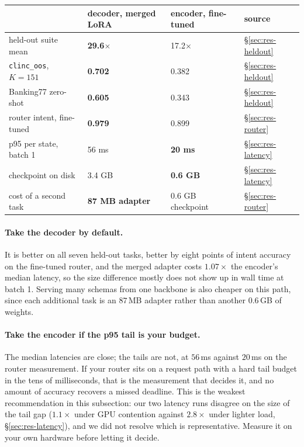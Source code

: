 \begin{center}
\begin{tabular}{llll}
\toprule
 & decoder, merged LoRA & encoder, fine-tuned & source \\
\midrule
held-out suite mean      & \textbf{29.6$\times$} & 17.2$\times$ & \S\ref{sec:res-heldout} \\
\texttt{clinc\_oos}, $K{=}151$ & \textbf{0.702} & 0.382 & \S\ref{sec:res-heldout} \\
Banking77 zero-shot      & \textbf{0.605} & 0.343 & \S\ref{sec:res-heldout} \\
router intent, fine-tuned & \textbf{0.979} & 0.899 & \S\ref{sec:res-router} \\
p95 per state, batch 1   & 56 ms & \textbf{20 ms} & \S\ref{sec:res-latency} \\
checkpoint on disk       & 3.4 GB & \textbf{0.6 GB} & \S\ref{sec:res-latency} \\
cost of a second task    & \textbf{87 MB adapter} & 0.6 GB checkpoint & \S\ref{sec:res-router} \\
\bottomrule
\end{tabular}
\end{center}

\paragraph{Take the decoder by default.} It is better on all seven
held-out tasks, better by eight points of intent accuracy on the
fine-tuned router, and the merged adapter costs $1.07\times$ the
encoder's median latency, so the size difference mostly does not show up
in wall time at batch 1. Serving many schemas from one backbone is also
cheaper on this path, since each additional task is an $87$\,MB adapter
rather than another $0.6$\,GB of weights.

\paragraph{Take the encoder if the p95 tail is your budget.} The median
latencies are close; the tails are not, at $56$\,ms against $20$\,ms on
the router measurement. If your router sits on a request path with a hard
tail budget in the tens of milliseconds, that is the measurement that
decides it, and no amount of accuracy recovers a missed deadline. This is
the weakest recommendation in this subsection: our two latency runs
disagree on the size of the tail gap ($1.1\times$ under GPU contention
against $2.8\times$ under lighter load, \S\ref{sec:res-latency}), and we
did not resolve which is representative. Measure it on your own hardware
before letting it decide.

